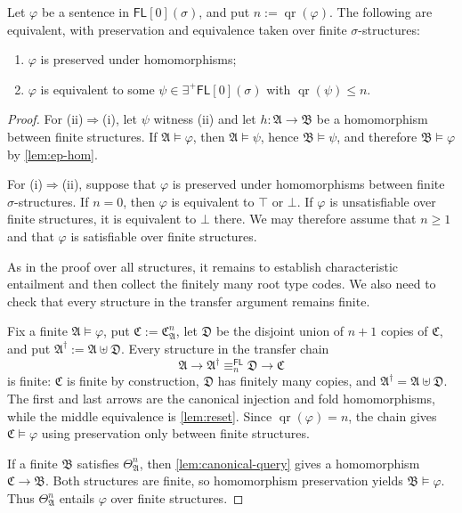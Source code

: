 \documentclass[10pt,a4paper]{amsart}
\newcommand{\A}{\mathfrak{A}}
\newcommand{\B}{\mathfrak{B}}
\newcommand{\C}{\mathfrak{C}}
\newcommand{\D}{\mathfrak{D}}
\newcommand{\EPFL}{\exists^{+}\!\mathsf{FL}}
\newcommand{\FL}{\mathsf{FL}}
\newcommand{\false}{\bot}
\newcommand{\qr}{\operatorname{qr}}
\newcommand{\true}{\top}
\begin{document}
\begin{thm}\label{thm:finite-hpt}
Let $\varphi$ be a sentence in $\FL[0](\sigma)$, and put
$n:=\qr(\varphi)$.  The following are
equivalent, with preservation and equivalence taken over finite
$\sigma$-structures:
\begin{enumerate}[label=\textup{(\roman*)}]
  \item $\varphi$ is preserved under homomorphisms;
  \item $\varphi$ is equivalent to some $\psi\in\EPFL[0](\sigma)$ with
  $\qr(\psi)\leq n$.
\end{enumerate}
\end{thm}

\begin{proof}
For \textup{(ii)}$\Rightarrow$\textup{(i)}, let $\psi$ witness
\textup{(ii)} and let $h:\A\to\B$ be a homomorphism between finite structures.
If $\A\models\varphi$, then $\A\models\psi$, hence $\B\models\psi$, and
therefore $\B\models\varphi$ by \cref{lem:ep-hom}.

For \textup{(i)}$\Rightarrow$\textup{(ii)}, suppose that $\varphi$ is
preserved under homomorphisms between finite $\sigma$-structures.  If $n=0$,
then $\varphi$ is equivalent to $\true$ or $\false$.  If $\varphi$ is
unsatisfiable over finite structures, it is equivalent to $\false$ there.  We
may therefore assume that $n\geq1$ and that $\varphi$ is satisfiable over
finite structures.

As in the proof over all structures, it remains to establish characteristic
entailment and then collect the finitely many root type codes.  We also need
to check that every structure in the transfer argument remains finite.

Fix a finite $\A\models\varphi$, put $\C:=\C_{\A}^{n}$, let $\D$ be the
disjoint union of $n+1$ copies of $\C$, and put
$\A^{\dagger}:=\A\uplus\D$.  Every structure in the transfer chain
\[
   \A\longrightarrow\A^{\dagger}
   \equiv_n^{\FL}\D
   \longrightarrow\C
\]
is finite: $\C$ is finite by construction, $\D$ has finitely many copies, and
$\A^{\dagger}=\A\uplus\D$.  The first and last arrows are the canonical
injection and fold homomorphisms, while the middle equivalence is
\cref{lem:reset}.  Since $\qr(\varphi)=n$, the chain gives
$\C\models\varphi$ using preservation only between finite structures.

If a finite $\B$ satisfies $\Theta_{\A}^{n}$, then
\cref{lem:canonical-query} gives a homomorphism $\C\to\B$.  Both structures
are finite, so homomorphism preservation yields $\B\models\varphi$.  Thus
$\Theta_{\A}^{n}$ entails $\varphi$ over finite structures.


\end{proof}
\end{document}
